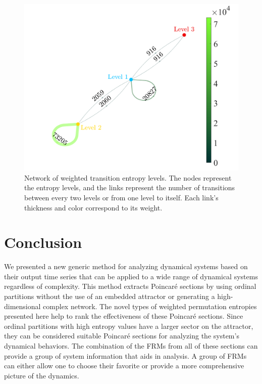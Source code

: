 \documentclass[%
 aip,
 amsmath,amssymb,
 reprint,%
]{revtex4-1}
\begin{document}
\begin{figure}[htbp]
\centerline{\includegraphics[width=\linewidth]{NetworkLevels_3.png}}
\caption{Network of weighted transition entropy levels. The nodes represent the entropy levels, and the links represent the number of transitions between every two levels or from one level to itself. Each link's thickness and color correspond to its weight.}
\label{NetworkLevels}
\end{figure}

\section{\label{sec:Conclusion}Conclusion}

We presented a new generic method for analyzing dynamical systems based on their output time series that can be applied to a wide range of dynamical systems regardless of complexity. This method extracts Poincar\'e sections by using ordinal partitions without the use of an embedded attractor or generating a high-dimensional complex network.
The novel types of weighted permutation entropies presented here help to rank the effectiveness of these Poincar\'e sections. Since ordinal partitions with high entropy values have a larger sector on the attractor, they can be considered suitable Poincar\'e sections for analyzing the system's dynamical behaviors.
The combination of the FRMs from all of these sections can provide a group of system information that aids in analysis. 
A group of FRMs can either allow one to choose their favorite or provide a more comprehensive picture of the dynamics.
\end{document}
